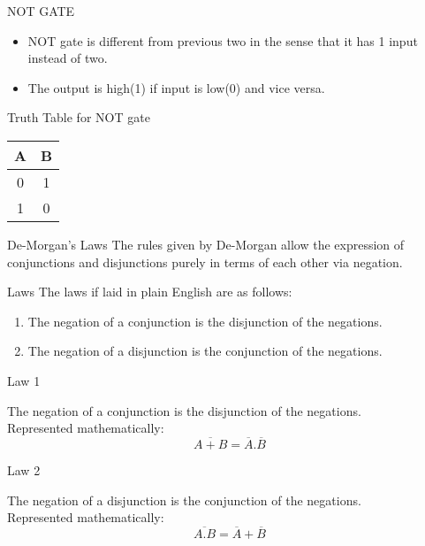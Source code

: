 \documentclass{beamer}
\begin{document}
\begin{frame}{NOT GATE}
\begin{block}{}
\begin{itemize}
  \item NOT gate is different from previous two in the sense that it has 1 input instead of two.
  \item The output is high(1) if input is low(0) and vice versa.
\end{itemize}
\end{block}
\medskip
\medskip
\pause
\begin{block}{Truth Table for NOT gate}
\begin{tabular}{|c|c|}
\hline
 \textbf{A} &
\textbf{B} \\
\hline
\hline
 0 & 1 \\
\hline
 1 & 0 \\
\hline
\end{tabular}
\end{block}
\end{frame}
\begin{frame}{De-Morgan's Laws}
The rules given by De-Morgan allow the expression of conjunctions and disjunctions purely in terms of each other via negation.
\pause
\begin{block}{Laws}
The laws if laid in plain English are as follows:
\begin{enumerate}
\item The negation of a conjunction is the disjunction of the negations.
\item The negation of a disjunction is the conjunction of the negations.
\end{enumerate}
\end{block}
\end{frame}
\begin{frame}{Law 1}
\begin{theorem}
The negation of a conjunction is the disjunction of the negations.\\
Represented mathematically:
\begin{equation}
\overline{A+B}=\overline{A}.\overline{B}
\end{equation}
\end{theorem}
\end{frame}
\begin{frame}{Law 2}
\begin{theorem}
The negation of a disjunction is the conjunction of the negations.\\
Represented mathematically:
\begin{equation}
\overline{A.B}=\overline{A}+\overline{B}
\end{equation}
\end{theorem}
\end{frame}
\end{document}
